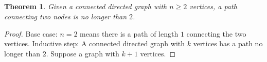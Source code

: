 \documentclass{article}
\newtheorem{theorem}{Theorem}
\begin{document}
\subsection{}

\begin{theorem}
    Given a connected directed graph with \(n \geqslant 2\) vertices, a path connecting two nodes is no longer than \(2\).
\end{theorem}
\begin{proof}
    Base case: \(n = 2\) means there is a path of length \(1\) connecting the two vertices.
    Inductive step: A connected directed graph with \(k\) vertices has a path no longer than \(2\).
    Suppose a graph with \(k + 1\) vertices.
\end{proof}
\end{document}
